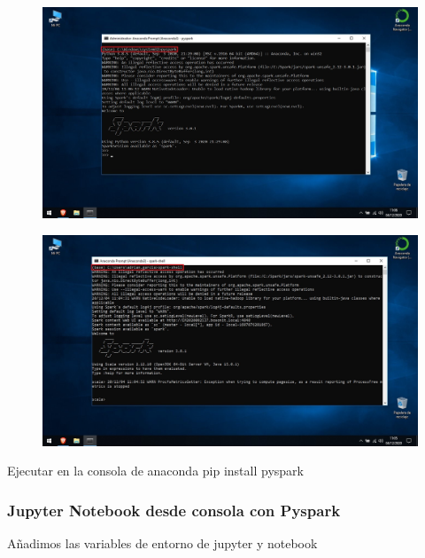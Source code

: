 \documentclass[a4paper,10pt]{article}
\begin{document}
\begin{figure}[H]
\begin{center}
\includegraphics[width=500pt]{./fotos/introduccion/18 - Pyspark funcionando (V).jpg}
\end{center}
\end{figure}

\begin{figure}[H]
\begin{center}
\includegraphics[width=500pt]{./fotos/introduccion/18 - Scala funcionando (V).jpg}
\end{center}
\end{figure}

Ejecutar en la consola de anaconda pip install pyspark 

\subsubsection{Jupyter Notebook desde consola con Pyspark}

Añadimos las variables de entorno de jupyter y notebook 
\end{document}
